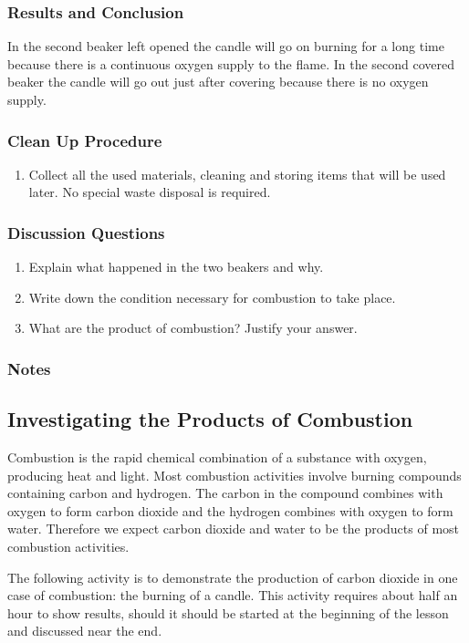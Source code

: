 \subsubsection*{Results and Conclusion}
In the second beaker left opened the candle will go on burning for a long time because there is a continuous oxygen supply to the flame. In the second covered beaker the candle will go out just after covering because there is no oxygen supply.

\subsubsection*{Clean Up Procedure}
\begin{enumerate}
\item{Collect all the used materials, cleaning and storing items that will be used later. No special waste disposal is required.}
\end{enumerate}

\subsubsection*{Discussion Questions}
\begin{enumerate}
\item{Explain what happened in the two beakers and why.}
\item{Write down the condition necessary for combustion to take place.}
\item{What are the product of  combustion? Justify your answer.}
\end{enumerate}

\subsubsection*{Notes}


\subsection{Investigating the Products of Combustion}

Combustion is the rapid chemical combination of a substance with oxygen, producing heat and light. Most combustion activities involve burning compounds containing carbon and hydrogen. The carbon in the compound combines with oxygen to form carbon dioxide and the hydrogen combines with oxygen to form water. Therefore we expect carbon dioxide and water to be the products of  
most combustion activities.

The following activity is to demonstrate the production of carbon dioxide in one case of combustion: the burning of a candle. This activity requires about half an hour to show results, should it should be started at the beginning of the lesson and discussed near the end.

